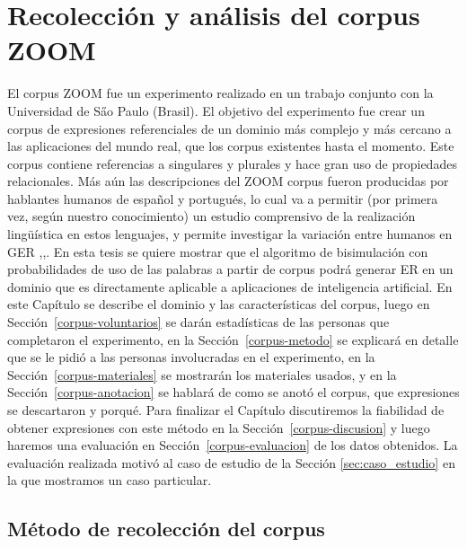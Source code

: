 \chapter{Recolecci\'on y an\'alisis del corpus ZOOM}
\label{sec:corpus}

El corpus ZOOM fue un experimento realizado en un trabajo conjunto con la Universidad de S\H ao Paulo (Brasil). El objetivo del experimento fue crear un corpus de expresiones referenciales de un dominio m\'as complejo y m\'as cercano a las aplicaciones del mundo real, que los corpus existentes hasta el momento. Este corpus contiene referencias a singulares y plurales y hace gran uso de propiedades relacionales. M\'as a\'un las descripciones del ZOOM corpus fueron producidas por hablantes humanos de espa\~nol y portugu\'es, lo cual va a permitir (por primera vez, seg\'un nuestro conocimiento) un estudio comprensivo de la realizaci\'on ling\"u\'istica en estos lenguajes, y permite investigar la variaci\'on entre humanos en GER \cite{trainable-speaker},\cite{romina-coling},\cite{non-det}. 
En esta tesis se quiere mostrar que el algoritmo de bisimulaci\'on con probabilidades de uso de las palabras a partir de corpus podr\'a generar ER en un dominio que es directamente aplicable a aplicaciones de inteligencia artificial.
En este Cap\'itulo se describe el dominio y las caracter\'isticas del corpus, luego en Secci\'on~\ref{corpus-voluntarios} se dar\'an estad\'isticas de las personas que completaron el experimento, en la Secci\'on~\ref{corpus-metodo} se explicar\'a en detalle que se le pidi\'o a las personas involucradas en el experimento, en la Secci\'on~\ref{corpus-materiales} se mostrar\'an los materiales usados, y en la Secci\'on~\ref{corpus-anotacion} se hablar\'a de como se anot\'o el corpus, que expresiones se descartaron y porqu\'e. Para finalizar el Cap\'itulo discutiremos la fiabilidad de obtener expresiones con este m\'etodo en la Secci\'on~\ref{corpus-discusion} y luego haremos una evaluaci\'on en Secci\'on~\ref{corpus-evaluacion} de los datos obtenidos. La evaluaci\'on realizada motiv\'o al caso de estudio de la Secci\'on \ref{sec:caso_estudio} en la que mostramos un caso particular.

\section{M\'etodo de recolecci\'on del corpus}


